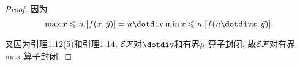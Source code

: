 \begin{proof}
    因为$$\max x\leqslant n. [f(x,\vec{y})]=n\dotdiv\min x\leqslant n. [f(n\dotdiv x,\vec{y})],$$
	
    又因为引理1.12(5)和引理1.14, $\mathcal{EF}$对$\dotdiv$和有界$\mu$-算子封闭, 故$\mathcal{EF}$对有界max-算子封闭.
\end{proof}